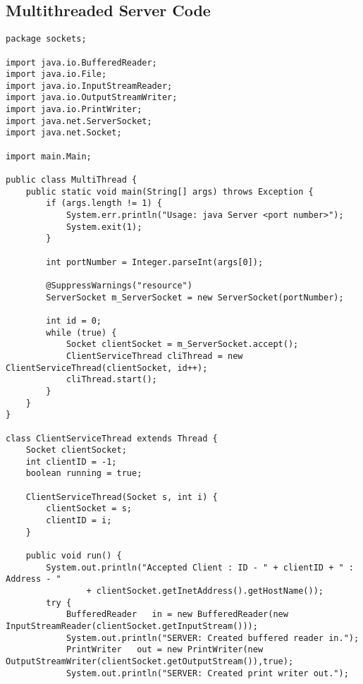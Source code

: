 \documentclass{article}
\begin{document}
	\subsection{Multithreaded Server Code}
		\begin{lstlisting}
package sockets;

import java.io.BufferedReader;
import java.io.File;
import java.io.InputStreamReader;
import java.io.OutputStreamWriter;
import java.io.PrintWriter;
import java.net.ServerSocket;
import java.net.Socket;

import main.Main;

public class MultiThread {
	public static void main(String[] args) throws Exception {
		if (args.length != 1) {
			System.err.println("Usage: java Server <port number>");
			System.exit(1);
		}

		int portNumber = Integer.parseInt(args[0]);
		
		@SuppressWarnings("resource")
		ServerSocket m_ServerSocket = new ServerSocket(portNumber);
		
		int id = 0;
		while (true) {
			Socket clientSocket = m_ServerSocket.accept();
			ClientServiceThread cliThread = new ClientServiceThread(clientSocket, id++);
			cliThread.start();
		}
	}
}

class ClientServiceThread extends Thread {
	Socket clientSocket;
	int clientID = -1;
	boolean running = true;

	ClientServiceThread(Socket s, int i) {
		clientSocket = s;
		clientID = i;
	}

	public void run() {
		System.out.println("Accepted Client : ID - " + clientID + " : Address - "
				+ clientSocket.getInetAddress().getHostName());
		try {
			BufferedReader   in = new BufferedReader(new InputStreamReader(clientSocket.getInputStream()));
			System.out.println("SERVER: Created buffered reader in.");
			PrintWriter   out = new PrintWriter(new OutputStreamWriter(clientSocket.getOutputStream()),true);
			System.out.println("SERVER: Created print writer out.");
            

\end{lstlisting}
\end{document}
